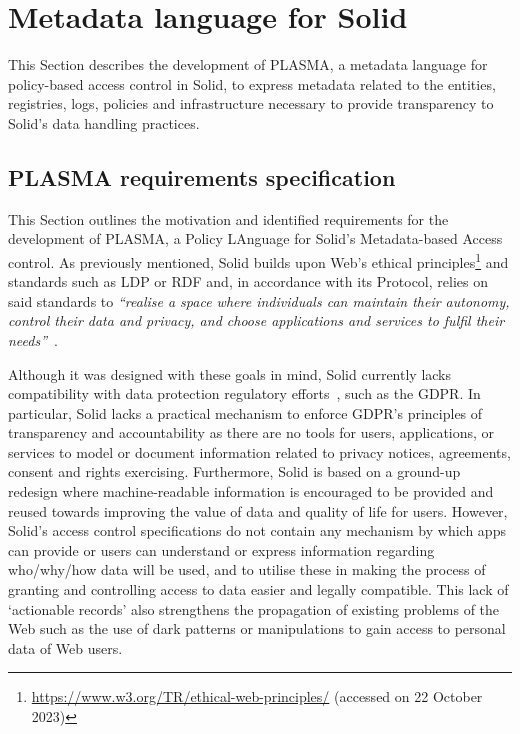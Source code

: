 \section{Metadata language for Solid}
\label{sec:plasma}

This Section describes the development of PLASMA, a metadata language for policy-based access control in Solid, to express metadata related to the entities, registries, logs, policies and infrastructure necessary to provide transparency to Solid's data handling practices.

\subsection{PLASMA requirements specification}
\label{sec:plasma_requirements}

This Section outlines the motivation and identified requirements for the development of PLASMA, a Policy LAnguage for Solid’s Metadata-based Access control.
As previously mentioned, Solid builds upon Web's ethical principles\footnote{\url{https://www.w3.org/TR/ethical-web-principles/} (accessed on 22 October 2023)} and standards such as LDP or RDF and, in accordance with its Protocol, relies on said standards to \textit{``realise a space where individuals can maintain their autonomy, control their data and privacy, and choose applications and services to fulfil their needs''}~\citep{capadisli_solid_2022}.

Although it was designed with these goals in mind, Solid currently lacks compatibility with data protection regulatory efforts~\citep{pandit_making_2023}, such as the GDPR.
In particular, Solid lacks a practical mechanism to enforce GDPR's principles of transparency and accountability as there are no tools for users, applications, or services to model or document information related to privacy notices, agreements, consent and rights exercising.
Furthermore, Solid is based on a ground-up redesign where machine-readable information is encouraged to be provided and reused towards improving the value of data and quality of life for users.
However, Solid's access control specifications do not contain any mechanism by which apps can provide or users can understand or express information regarding who/why/how data will be used, and to utilise these in making the process of granting and controlling access to data easier and legally compatible.
This lack of `actionable records' also strengthens the propagation of existing problems of the Web such as the use of dark patterns or manipulations to gain access to personal data of Web users.

